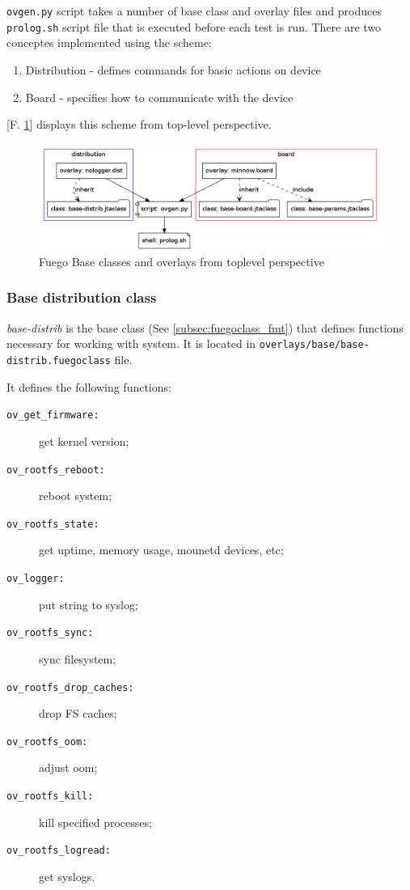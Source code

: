 \texttt{ovgen.py} script takes a number of base class and overlay files and produces \texttt{prolog.sh} script file that
is executed before each test is run.
There are two conceptes implemented using the scheme:
\begin{enumerate}
\item Distribution - defines commands for basic actions on device
\item Board - specifies how to communicate with the device
\end{enumerate}
[F. \ref{fig:base_ovs_toplevel}] displays this scheme from top-level perspective.
\begin{figure}[H]
  \includegraphics*[width=16cm]{overlays_toplevel.png}
  \caption{Fuego Base classes and overlays from toplevel perspective}
  \label{fig:base_ovs_toplevel}
\end{figure}

\subsubsection{Base distribution class}
\textit{base-distrib} is the base class (See \ref{subsec:fuegoclass_fmt}) that defines functions necessary for working with system. It is located in \texttt{overlays/base/base-distrib.fuegoclass} file.

It defines the following functions:

\begin{description}
\item[\texttt{ov\_get\_firmware:}] get kernel version;
\item[\texttt{ov\_rootfs\_reboot:}] reboot system;
\item[\texttt{ov\_rootfs\_state:}] get uptime, memory usage, mounetd devices, etc;
\item[\texttt{ov\_logger:}] put string to syslog;
\item[\texttt{ov\_rootfs\_sync:}] sync filesystem;
\item[\texttt{ov\_rootfs\_drop\_caches:}] drop FS caches;
\item[\texttt{ov\_rootfs\_oom:}] adjust oom;
\item[\texttt{ov\_rootfs\_kill:}] kill specified processes;
\item[\texttt{ov\_rootfs\_logread:}] get syslogs.
\end{description}

